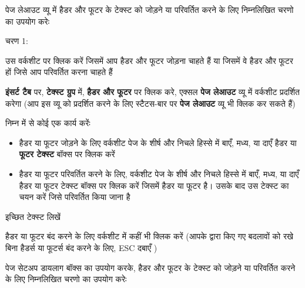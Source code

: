 पेज लेआउट व्यू में हैडर और फूटर के टेक्स्ट को जोड़ने या परिवर्तित करने के लिए निम्नलिखित चरणो का उपयोग करेः

\begin{descriptionSimple}{चरण 1:}
\item[चरण 1] उस वर्कशीट पर क्लिक करें जिसमें आप हैडर और फूटर जोड़ना चाहते हैं या जिसमें वे हैडर और फूटर हों जिसे आप परिवर्तित करना चाहते हैं
\item[चरण 2] \textbf{इंसर्ट टैब} पर, \textbf{टेक्स्ट ग्रुप} में, \textbf{हैडर और फूटर} पर क्लिक करे, एक्सल \textbf{पेज लेआउट} व्यू में वर्कशीट प्रदर्शित करेगा (आप इस व्यू को प्रदर्शित करने के लिए स्टैटस-बार पर \textbf{पेज लेआउट} व्यू भी क्लिक कर सकते हैं)
\item[चरण  3] निम्न में से कोई एक कार्य करेंः
			\begin{itemize}
			\item हैडर या फूटर जोड़ने के लिए वर्कशीट पेज के शीर्ष और निचले हिस्से में बाएँ, मध्य, या दाएँ हैडर या \textbf{फूटर टेक्स्ट} बॉक्स पर क्लिक करें
			\item हैडर या फूटर परिवर्तित करने के लिए, वर्कशीट पेज के शीर्ष और निचले हिस्से में बाएँ, मध्य, या दाएँ हैडर या फूटर टेक्स्ट बॉक्स पर क्लिक करें जिसमें हैडर या फूटर है। उसके बाद उस टेक्स्ट का चयन करें जिसे परिवर्तित किया जाना है
			\end{itemize}
\item[चरण 4] इच्छित टेक्स्ट लिखें
\end{descriptionSimple}

हैडर या फूटर बंद करने के लिए वर्कशीट में कहीं भी क्लिक करें (आपके द्वारा किए गए बदलावों को रखे बिना हैडर्स या फूटर्स बंद करने के लिए,  {\rm ESC}  दबाएँ )

पेज सेटअप डायलाग बॉक्स का उपयोग करके, हैडर और फूटर के टेक्स्ट को जोड़ने या परिवर्तित करने के लिए निम्नलिखित चरणो का उपयोग करेः
		
